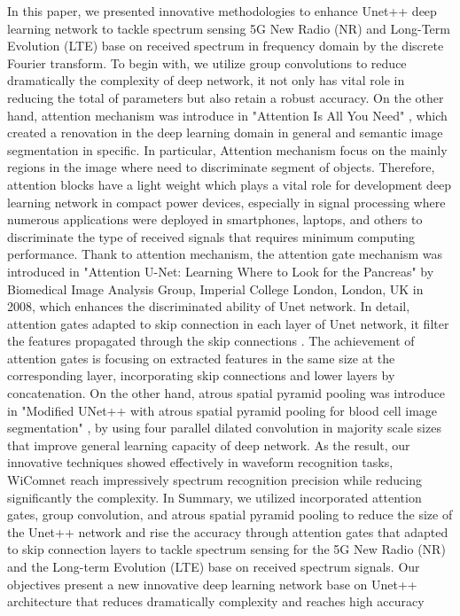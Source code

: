 \documentclass[journal]{IEEEtran} %
\begin{document}
In this paper, we presented innovative methodologies to enhance Unet++ deep learning network to tackle spectrum sensing 5G New Radio (NR) and Long-Term Evolution (LTE) base on received spectrum in frequency domain by the discrete Fourier transform. To begin with, we utilize group convolutions \cite{b9} to reduce dramatically the complexity of deep network, it not only has vital role in reducing the total of parameters but also retain a robust accuracy. On the other hand, attention mechanism was introduce in "Attention Is All You Need" \cite{b4}, which created a renovation in the deep learning domain in general and semantic image segmentation in specific. In particular, Attention mechanism focus on the mainly regions in the image where need to discriminate segment of objects. Therefore, attention blocks have a light weight which plays a vital role for development deep learning network in compact power devices, especially in signal processing where numerous applications were deployed in smartphones, laptops, and others to discriminate the type of received signals that requires minimum computing performance. Thank to attention mechanism, the attention gate mechanism was introduced in "Attention U-Net: Learning Where to Look for the Pancreas" \cite{b3} by Biomedical Image Analysis Group, Imperial College London, London, UK in 2008, which enhances the discriminated ability of Unet network. In detail, attention gates adapted to skip connection in each layer of Unet network, it filter the features propagated through the skip connections \cite{b3}. The achievement of attention gates is focusing on extracted features in the same size at the corresponding layer, incorporating skip connections and lower layers by concatenation. On the other hand, atrous spatial pyramid pooling was introduce in "Modified UNet++ with atrous spatial pyramid pooling for blood cell image segmentation" \cite{b10}, by using four parallel dilated convolution in majority scale sizes that improve general learning capacity of deep network. As the result, our innovative techniques showed effectively in waveform recognition tasks, WiComnet reach impressively spectrum recognition precision while reducing significantly the complexity. In Summary, we utilized incorporated attention gates, group convolution, and atrous spatial pyramid pooling \cite{b10} to reduce the size of the Unet++ network and rise the accuracy through attention gates that adapted to skip connection layers to tackle spectrum sensing for the 5G New Radio (NR) and the Long-term Evolution (LTE) base on received spectrum signals. Our objectives present a new innovative deep learning network base on Unet++ architecture that reduces dramatically complexity and reaches high accuracy
\end{document}
